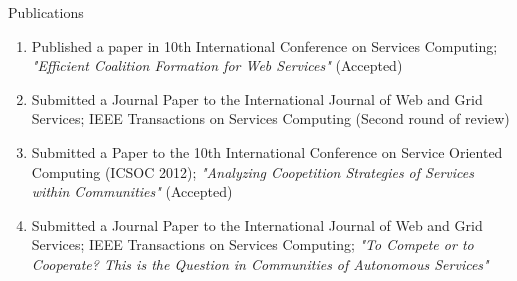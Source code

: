 \documentclass{beamer}
\begin{document}
\begin{frame}{Publications}

    \begin{enumerate}
        \item Published a paper in 10th International Conference on Services Computing; \emph{"Efficient Coalition Formation for Web Services"} {\color{blue} (Accepted)}
        \item Submitted a Journal Paper to the International Journal of Web and Grid Services; IEEE Transactions on Services Computing {\color{blue} (Second round of review)}
        \item Submitted a Paper to the 10th International Conference on Service Oriented Computing (ICSOC 2012); \emph{"Analyzing Coopetition Strategies of Services within Communities"} {\color{blue} (Accepted)}
        \item Submitted a Journal Paper to the International Journal of Web and Grid Services; IEEE Transactions on Services Computing; \emph{"To Compete or to Cooperate? This is the Question in Communities of Autonomous Services"}
    \end{enumerate}


\end{frame}
\end{document}
